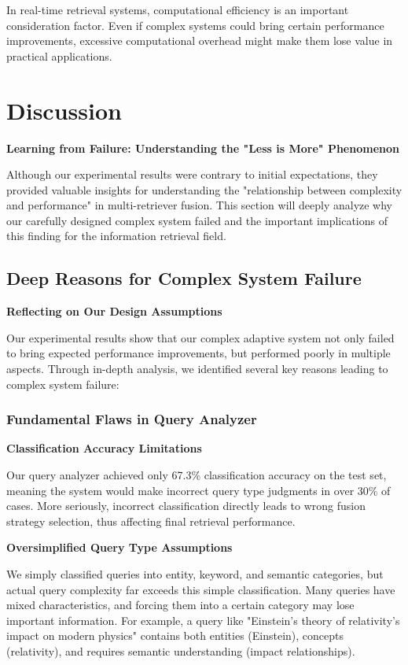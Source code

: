 \documentclass[letterpaper]{article} %
\begin{document}
In real-time retrieval systems, computational efficiency is an important consideration factor. Even if complex systems could bring certain performance improvements, excessive computational overhead might make them lose value in practical applications.

\section{Discussion}

\textbf{Learning from Failure: Understanding the "Less is More" Phenomenon}

Although our experimental results were contrary to initial expectations, they provided valuable insights for understanding the "relationship between complexity and performance" in multi-retriever fusion. This section will deeply analyze why our carefully designed complex system failed and the important implications of this finding for the information retrieval field.

\subsection{Deep Reasons for Complex System Failure}

\textbf{Reflecting on Our Design Assumptions}

Our experimental results show that our complex adaptive system not only failed to bring expected performance improvements, but performed poorly in multiple aspects. Through in-depth analysis, we identified several key reasons leading to complex system failure:

\subsubsection{Fundamental Flaws in Query Analyzer}

\textbf{Classification Accuracy Limitations}

Our query analyzer achieved only 67.3\% classification accuracy on the test set, meaning the system would make incorrect query type judgments in over 30\% of cases. More seriously, incorrect classification directly leads to wrong fusion strategy selection, thus affecting final retrieval performance.

\textbf{Oversimplified Query Type Assumptions}

We simply classified queries into entity, keyword, and semantic categories, but actual query complexity far exceeds this simple classification. Many queries have mixed characteristics, and forcing them into a certain category may lose important information. For example, a query like "Einstein's theory of relativity's impact on modern physics" contains both entities (Einstein), concepts (relativity), and requires semantic understanding (impact relationships).
\end{document}

